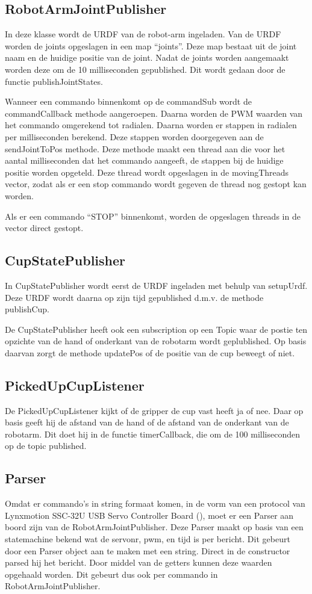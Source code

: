 \documentclass[12pt, legalpaper]{article}
\begin{document}
    \subsection{RobotArmJointPublisher}
    In deze klasse wordt de URDF van de robot-arm ingeladen. Van de URDF worden de joints opgeslagen in een map ``joints''.
    Deze map bestaat uit de joint naam en de huidige positie van de joint.
    Nadat de joints worden aangemaakt worden deze om de 10 milliseconden gepublished. Dit wordt gedaan door de functie publishJointStates.
    
    Wanneer een commando binnenkomt op de commandSub wordt de commandCallback methode aangeroepen. Daarna worden de PWM waarden van het commando omgerekend tot radialen.
    Daarna worden er stappen in radialen per milliseconden berekend.
    Deze stappen worden doorgegeven aan de sendJointToPos methode. Deze methode maakt een thread aan die voor het aantal milliseconden dat het commando aangeeft, de stappen bij de huidige positie worden opgeteld.
    Deze thread wordt opgeslagen in de movingThreads vector, zodat als er een stop commando wordt gegeven de thread nog gestopt kan worden.

    Als er een commando ``STOP'' binnenkomt, worden de opgeslagen threads in de vector direct gestopt.

    \subsection{CupStatePublisher}
    In CupStatePublisher wordt eerst de URDF ingeladen met behulp van setupUrdf.
    Deze URDF wordt daarna op zijn tijd gepublished d.m.v. de methode publishCup.

    De CupStatePublisher heeft ook een subscription op een Topic waar de postie ten opzichte van de hand of onderkant van de robotarm wordt geplublished.
    Op basis daarvan zorgt de methode updatePos of de positie van de cup beweegt of niet.

    \subsection{PickedUpCupListener}
    De PickedUpCupListener kijkt of de gripper de cup vast heeft ja of nee. Daar op basis geeft hij de afstand van de hand of de afstand van de onderkant van de robotarm.
    Dit doet hij in de functie timerCallback, die om de 100 milliseconden op de topic published.

    \subsection{Parser}
    Omdat er commando's in string formaat komen, in de vorm van een protocol van Lynxmotion SSC-32U USB Servo Controller Board (\cite{lynxmoti36:online}), moet er een Parser aan boord zijn van de RobotArmJointPublisher.
    Deze Parser maakt op basis van een statemachine bekend wat de servonr, pwm, en tijd is per bericht.
    Dit gebeurt door een Parser object aan te maken met een string. Direct in de constructor parsed hij het bericht.
    Door middel van de getters kunnen deze waarden opgehaald worden. Dit gebeurt dus ook per commando in RobotArmJointPublisher.
\end{document}
